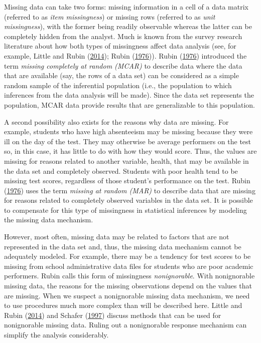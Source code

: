 \documentclass[]{krantz}
\begin{document}
Missing data can take two forms: missing information in a cell of a data
matrix (referred to as \emph{item missingness}) or missing rows
(referred to as \emph{unit missingness}), with the former being readily
observable whereas the latter can be completely hidden from the analyst.
Much is known from the survey research literature about how both types
of missingness affect data analysis (see, for example, Little and Rubin
(\protect\hyperlink{ref-little2014statistical}{2014}); Rubin
(\protect\hyperlink{ref-rubin1976}{1976})). Rubin
(\protect\hyperlink{ref-rubin1976}{1976}) introduced the term
\emph{missing completely at random (MCAR)} to describe data where the
data that are available (say, the rows of a data set) can be considered
as a simple random sample of the inferential population (i.e., the
population to which inferences from the data analysis will be made).
Since the data set represents the population, MCAR data provide results
that are generalizable to this population.

A second possibility also exists for the reasons why data are missing.
For example, students who have high absenteeism may be missing because
they were ill on the day of the test. They may otherwise be average
performers on the test so, in this case, it has little to do with how
they would score. Thus, the values are missing for reasons related to
another variable, health, that may be available in the data set and
completely observed. Students with poor health tend to be missing test
scores, regardless of those student's performance on the test. Rubin
(\protect\hyperlink{ref-rubin1976}{1976}) uses the term \emph{missing at
random (MAR)} to describe data that are missing for reasons related to
completely observed variables in the data set. It is possible to
compensate for this type of missingness in statistical inferences by
modeling the missing data mechanism.

However, most often, missing data may be related to factors that are not
represented in the data set and, thus, the missing data mechanism cannot
be adequately modeled. For example, there may be a tendency for test
scores to be missing from school administrative data files for students
who are poor academic performers. Rubin calls this form of missingness
\emph{nonignorable}. With nonignorable missing data, the reasons for the
missing observations depend on the values that are missing. When we
suspect a nonignorable missing data mechanism, we need to use procedures
much more complex than will be described here. Little and Rubin
(\protect\hyperlink{ref-little2014statistical}{2014}) and Schafer
(\protect\hyperlink{ref-schafer1997analysis}{1997}) discuss methods that
can be used for nonignorable missing data. Ruling out a nonignorable
response mechanism can simplify the analysis considerably.
\end{document}
